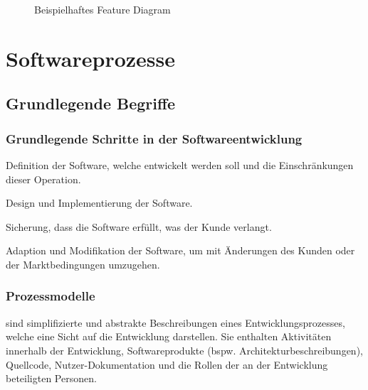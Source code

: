 \documentclass[
    ngerman,
    color=3b,
    summary,
    boxarc,
    main,
]{rubos-tuda-template}
\begin{document}
\begin{figure}[ht]
    \caption{Beispielhaftes Feature Diagram}
\end{figure}

\clearpage
\section{Softwareprozesse}
\subsection{Grundlegende Begriffe}
\subsubsection{Grundlegende Schritte in der Softwareentwicklung}
\begin{definition}
    Definition der Software, welche entwickelt werden soll und die Einschränkungen dieser Operation.
\end{definition}
\begin{definition}
    Design und Implementierung der Software.
\end{definition}
\begin{definition}
    Sicherung, dass die Software erfüllt, was der Kunde verlangt.
\end{definition}
\begin{definition}
    Adaption und Modifikation der Software, um mit Änderungen des Kunden oder der Marktbedingungen umzugehen.
\end{definition}

\subsubsection{Prozessmodelle}
\begin{definition}[Softwareprozessmodelle]
    sind simplifizierte und abstrakte Beschreibungen eines Entwicklungsprozesses, welche eine Sicht auf die Entwicklung darstellen. Sie enthalten Aktivitäten innerhalb der Entwicklung, Softwareprodukte (bspw. Architekturbeschreibungen), Quellcode, Nutzer-Dokumentation und die Rollen der an der Entwicklung beteiligten Personen.
\end{definition}
\end{document}
